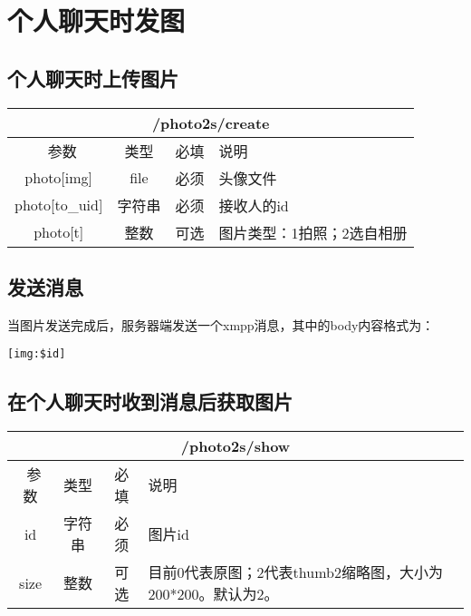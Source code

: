 \documentclass[cs4size]{ctexartutf8}
\begin{document}
\section{个人聊天时发图}

\subsection{个人聊天时上传图片}

\begin{table}[H]
   \begin{center}
\begin{tabular}{|c|c|c|p{12cm}|}
\hline
\multicolumn{4}{|c|}{/photo2s/create} \\
\hline\hline
 \  参数  & 类型 & 必填 &  说明  \\
\hline
 photo[img]  & file & 必须 &  头像文件\\
 \hline
 photo[to\_uid]  & 字符串 & 必须 &  接收人的id\\
\hline
  photo[t]  & 整数 & 可选 &  图片类型：1拍照；2选自相册\\
 \hline
\end{tabular}
   \end{center}
\end{table}


\subsection{发送消息}
当图片发送完成后，服务器端发送一个xmpp消息，其中的body内容格式为：

\begin{verbatim}
[img:$id]

\end{verbatim}

\subsection{在个人聊天时收到消息后获取图片}
\begin{table}[H]
   \begin{center}
\begin{tabular}{|c|c|c|p{12cm}|}
\hline
\multicolumn{4}{|c|}{/photo2s/show} \\
\hline\hline
 \  参数  & 类型 & 必填 &  说明  \\
  \hline
 id  & 字符串 & 必须 & 图片id\\
\hline
 size  & 整数 & 可选 &  目前0代表原图；2代表thumb2缩略图，大小为200*200。默认为2。\\ 
\hline
\end{tabular}
   \end{center}
\end{table}
\end{document}
